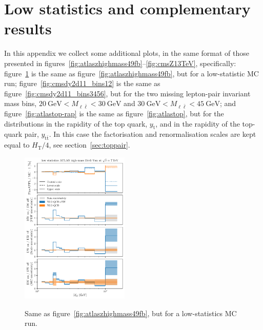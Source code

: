 \section{Low statistics and complementary results}
\label{app:add_plots}

In this appendix we collect some additional plots, in the same format of those
presented in figures~\ref{fig:atlaszhighmass49fb}--\ref{fig:cmsZ13TeV},
specifically: figure~\ref{fig:atlaszhighmass49fb-lowstat} is the same as
figure~\ref{fig:atlaszhighmass49fb}, but for a low-statistic MC run;
figure~\ref{fig:cmsdy2d11_bins12} is the same as
figure~\ref{fig:cmsdy2d11_bins3456}, but for the two missing lepton-pair
invariant mass bins,
$\SI{20}{\giga\electronvolt}<M_{\ell\bar\ell}<\SI{30}{\giga\electronvolt}$ and
$\SI{30}{\giga\electronvolt}<M_{\ell\bar\ell}<\SI{45}{\giga\electronvolt}$;
and figure~\ref{fig:atlastop-rap} is the same as figure~\ref{fig:atlastop},
but for the distributions in the rapidity of the top quark, $y_{\mathrm{t}}$,
and in the rapidity of the top-quark pair, $y_{\mathrm{t}\bar{\mathrm{t}}}$. In this
case the factorisation and renormalisation scales are kept equal to
$H_\mathrm{T}/4$, see section~\ref{sec:toppair}.

\begin{figure}[!t]
    \centering
    \includegraphics[width=0.46\textwidth]{figures/pineappl_ATLASZHIGHMASS49FB_lowstat}\\
    \caption{Same as figure~\ref{fig:atlaszhighmass49fb}, but for a
    low-statistics MC run.}
    \label{fig:atlaszhighmass49fb-lowstat}
\end{figure}

